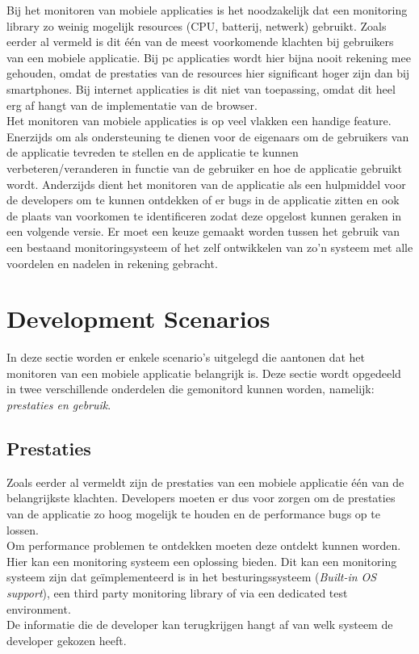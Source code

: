Bij het monitoren van mobiele applicaties is het noodzakelijk dat een monitoring library zo weinig mogelijk resources (CPU, batterij, netwerk) gebruikt. Zoals eerder al vermeld is dit \'e\'en van de meest voorkomende klachten bij gebruikers van een mobiele applicatie. Bij pc applicaties wordt hier bijna nooit rekening mee gehouden, omdat de prestaties van de resources hier significant hoger zijn dan bij smartphones. Bij internet applicaties is dit niet van toepassing, omdat dit heel erg af hangt van de implementatie van de browser. \\


Het monitoren van mobiele applicaties is op veel vlakken een handige feature. Enerzijds om als ondersteuning te dienen voor de eigenaars om de gebruikers van de applicatie tevreden te stellen en de applicatie te kunnen verbeteren/veranderen in functie van de gebruiker en hoe de applicatie gebruikt wordt. Anderzijds dient het monitoren van de applicatie als een hulpmiddel voor de developers om te kunnen ontdekken of er bugs in de applicatie zitten en ook de plaats van voorkomen te identificeren zodat deze opgelost kunnen geraken in een volgende versie. Er moet een keuze gemaakt worden tussen het gebruik van een bestaand monitoringsysteem of het zelf ontwikkelen van zo'n systeem met alle voordelen en nadelen in rekening gebracht. \\


\section{Development Scenarios}
In deze sectie worden er enkele scenario's uitgelegd die aantonen dat het monitoren van een mobiele applicatie belangrijk is. Deze sectie wordt opgedeeld in twee verschillende onderdelen die gemonitord kunnen worden, namelijk: \textit{prestaties en gebruik}.

\subsection{Prestaties}
Zoals eerder al vermeldt zijn de prestaties van een mobiele applicatie \'e\'en van de belangrijkste klachten. Developers moeten er dus voor zorgen om de prestaties van de applicatie zo hoog mogelijk te houden en de performance bugs op te lossen. \\

Om performance problemen te ontdekken moeten deze ontdekt kunnen worden. Hier kan een monitoring systeem een oplossing bieden. Dit kan een monitoring systeem zijn dat ge\"implementeerd is in het besturingssysteem (\textit{Built-in OS support}), een third party monitoring library of via een dedicated test environment.  \\
De informatie die de developer kan terugkrijgen hangt af van welk systeem de developer gekozen heeft.\\

